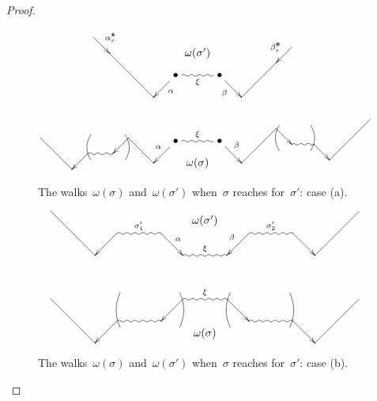\documentclass{memo-l}
\theoremstyle{definition}
\newcommand{\blossom}{^\text{\ding{96}}} %
\begin{document}
\begin{proof}
\begin{figure}[t]
\[
\xy
%
(-33,26)="-14";
(-28,21)="-13";
(-14,7)="-12";
(-7,14)*+{\bullet}="-11";
(0,21)*+{\omega(\sigma')};
(7,14)*+{\bullet}="11";
(14,7)="12";
(25,18)="13";
(30,23)="14";
%
{\ar^{\alpha_r\blossom} "-14";"-13"};
{\ar@{-} "-13";"-12"};
{\ar^\alpha "-11";"-12"};
{\ar@{~}_\xi "-11";"11"};
{\ar_\beta "11";"12"};
{\ar@{-} "12";"13"};
{\ar_{\beta_s\blossom} "14";"13"};
%
%
(-50,-6)="-7";
(-40,-16)="-6";
(-35,-11)="-5";
(-27,-11)="-4";
(-22,-6)="-3";
(-14,-14)="-2";
(-7,-7)*+{\bullet}="-1";
(0,-14)*+{\omega(\sigma)};
(7,-7)*+{\bullet}="1";
(14,-14)="2";
(25,-3)="3";
(30,-8)="4";
(37,-8)="5";
(42,-13)="6";
(55,0)="7";
%
{\ar@{-} "-7";"-6"};
{\ar "-5";"-6"};
{\ar@{~} "-5";"-4"};
{\ar "-3";"-4"};
{\ar@{-} "-3";"-2"};
{\ar_\alpha "-1";"-2"};
{\ar@{~}^\xi "-1";"1"};
{\ar^\beta "1";"2"};
{\ar@{-} "2";"3"};
{\ar "3";"4"};
{\ar@{~} "4";"5"};
{\ar "5";"6"};
{\ar@{-} "6";"7"};
%
{\ar@/^.3pc/@{-} (-23,-5);(-23,-13)};
{\ar@/_.3pc/@{-} (-34,-5);(-34,-13)};
%
{\ar@/_.3pc/@{-} (26,-2);(26,-10)};
{\ar@/^.3pc/@{-} (36,-2);(36,-10)};
%
\endxy
\]
    \caption{The walks~$\omega(\sigma)$ and~$\omega(\sigma')$ when~$\sigma$ reaches for~$\sigma'$: case (a).}
    \vspace{.1cm}
    \label{fig: dance case a}
\end{figure}

\begin{figure}[t]
\[
\xy
%
(-49,21)="-15";
(-35,7)="-14";
(-28,14)="-13";
(-14,14)="-12";
(-7,7)="-11";
(0,18)*+{\omega(\sigma')};
(7,7)="11";
(14,14)="12";
(28,14)="13";
(35,7)="14";
(49,21)="15";
%
{\ar@{-} "-15";"-14"};
{\ar "-13";"-14"};
{\ar@{~}^{\sigma'_1} "-13";"-12"};
{\ar^\alpha "-12";"-11"};
{\ar@{~}^\xi "-11";"11"};
{\ar_\beta "12";"11"};
{\ar@{~}^{\sigma'_2} "12";"13"};
{\ar "13";"14"};
{\ar@{-} "14";"15"};
%
%
(-49,-7)="-5";
(-35,-21)="-4";
(-28,-14)="-3";
(-14,-14)="-2";
(-7,-7)="-1";
(0,-18)*+{\omega(\sigma)};
(7,-7)="1";
(14,-14)="2";
(28,-14)="3";
(35,-21)="4";
(49,-7)="5";
%
{\ar@{-} "-5";"-4"};
{\ar "-3";"-4"};
{\ar@{~} "-3";"-2"};
{\ar "-1";"-2"};
{\ar@{~}^\xi "-1";"1"};
{\ar "1";"2"};
{\ar@{~} "2";"3"};
{\ar "3";"4"};
{\ar@{-} "4";"5"};
%
{\ar@/_.3pc/@{-} (8,-5);(8,-16)};
{\ar@/^.3pc/@{-} (27,-5);(27,-16)};
%
{\ar@/^.3pc/@{-} (-8,-5);(-8,-16)};
{\ar@/_.3pc/@{-} (-27,-5);(-27,-16)};
%
\endxy
\]
    \caption{The walks~$\omega(\sigma)$ and~$\omega(\sigma')$ when~$\sigma$ reaches for~$\sigma'$: case (b).}
    \vspace{.1cm}
    \label{fig: dance case b}
\end{figure}


\end{proof}
\end{document}

